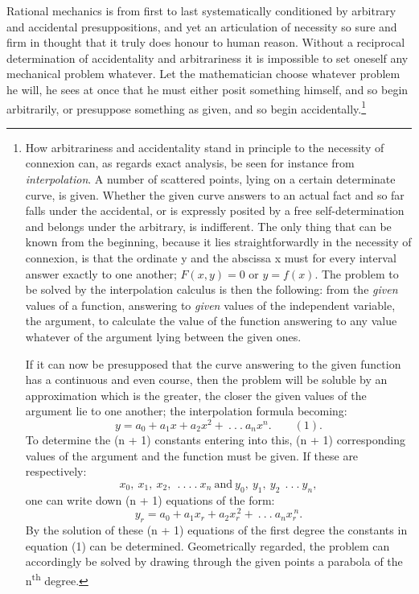 \documentclass[12pt,a4paper]{book}
\begin{document}
Rational mechanics is from first to last systematically conditioned by arbitrary and
accidental presuppositions, and yet an articulation of necessity so sure and firm in
thought that it truly does honour to human reason. Without a reciprocal determination of
accidentality and arbitrariness it is impossible to set oneself any mechanical problem
whatever. Let the mathematician choose whatever problem he will, he sees at once that he
must either posit something himself, and so begin arbitrarily, or presuppose
something as given, and so begin accidentally.\footnote{How arbitrariness and
accidentality stand in principle to the necessity of connexion can, as regards exact
analysis, be seen for instance from \emph{interpolation}. A number of scattered points,
lying on a certain determinate curve, is given. Whether the given curve answers to an
actual fact and so far falls under the accidental, or is expressly posited by a free
self-determination and belongs under the arbitrary, is indifferent. The only thing that
can be known from the beginning, because it lies straightforwardly in the necessity of
connexion, is that the ordinate y and the abscissa x must for every interval answer
exactly to one another; $F(x,y) = 0$ or $y = f(x)$. The problem to be solved by the
interpolation calculus is then the following: from the \emph{given} values of a function,
answering to \emph{given} values of the independent variable, the argument, to calculate
the value of the function answering to any value whatever of the argument lying between
the given ones.

If it can now be presupposed that the curve answering to the given function has a
continuous and even course, then the problem will be soluble by an approximation which is
the greater, the closer the given values of the argument lie to one another; the
interpolation formula becoming:
\[
y = a_{0} + a_{1} x + a_{2} x^{2} + \ .\ .\ .\ a_{n} x^{n}. \qquad (1).
\]
To determine the (n + 1) constants entering into this, (n + 1) corresponding values of the
argument and the function must be given. If these are respectively:
\[
x_{0},\ x_{1},\ x_{2},\ \ .\ .\ .\ .\ x_{n}\ \text{and}\ y_{0},\ y_{1},\ y_{2}\ \ .\ .\ .\ y_{n},
\]
one can write down (n + 1) equations of the form:
\[
y_{r} = a_{0} + a_{1} x_{r} + a_{2} x_{r}^{\,2} + \ .\ .\ .\ a_{n} x_{r}^{\,n}.
\]
By the solution of these (n + 1) equations of the first degree the constants in equation
(1) can be determined. Geometrically regarded, the problem can accordingly be solved by
drawing through the given points a parabola of the n\textsuperscript{th} degree.

}
\end{document}
